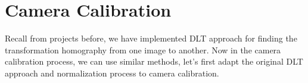 \documentclass[conference]{IEEEtran}
\begin{document}


\section{Camera Calibration}
Recall from projects before, we have implemented DLT approach for finding the transformation homography from one image to another. Now in the camera calibration process, we can use similar methods, let's first adapt the original DLT approach and normalization process to camera calibration. 
\end{document}
